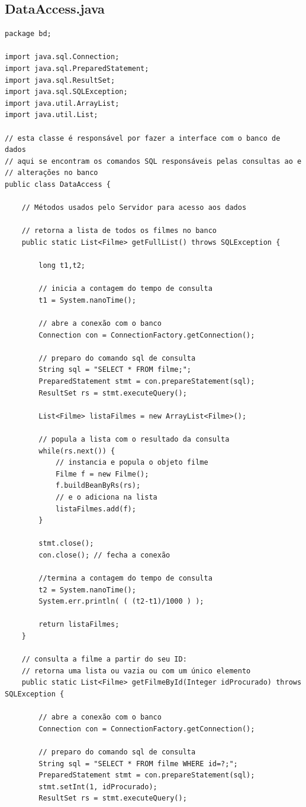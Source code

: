 \documentclass[11pt,twoside]{article}
\begin{document}
\subsection{DataAccess.java}       %
\begin{verbatim}
package bd;

import java.sql.Connection;
import java.sql.PreparedStatement;
import java.sql.ResultSet;
import java.sql.SQLException;
import java.util.ArrayList;
import java.util.List;

// esta classe é responsável por fazer a interface com o banco de dados
// aqui se encontram os comandos SQL responsáveis pelas consultas ao e 
// alterações no banco
public class DataAccess {

	// Métodos usados pelo Servidor para acesso aos dados	
	
	// retorna a lista de todos os filmes no banco
	public static List<Filme> getFullList() throws SQLException {
		
		long t1,t2;
		
		// inicia a contagem do tempo de consulta
    	t1 = System.nanoTime();
    	
		// abre a conexão com o banco
		Connection con = ConnectionFactory.getConnection();

		// preparo do comando sql de consulta
		String sql = "SELECT * FROM filme;";
		PreparedStatement stmt = con.prepareStatement(sql);
		ResultSet rs = stmt.executeQuery();

		List<Filme> listaFilmes = new ArrayList<Filme>();

		// popula a lista com o resultado da consulta
		while(rs.next()) {
			// instancia e popula o objeto filme
			Filme f = new Filme();
			f.buildBeanByRs(rs);
			// e o adiciona na lista
			listaFilmes.add(f);
		}

		stmt.close();
		con.close(); // fecha a conexão
		
		//termina a contagem do tempo de consulta
		t2 = System.nanoTime();
		System.err.println( ( (t2-t1)/1000 ) );
		
		return listaFilmes;
	}

	// consulta a filme a partir do seu ID:
	// retorna uma lista ou vazia ou com um único elemento
	public static List<Filme> getFilmeById(Integer idProcurado) throws SQLException {

		// abre a conexão com o banco
		Connection con = ConnectionFactory.getConnection();
		
		// preparo do comando sql de consulta
		String sql = "SELECT * FROM filme WHERE id=?;";
		PreparedStatement stmt = con.prepareStatement(sql);
		stmt.setInt(1, idProcurado);
		ResultSet rs = stmt.executeQuery();


\end{verbatim}
\end{document}

